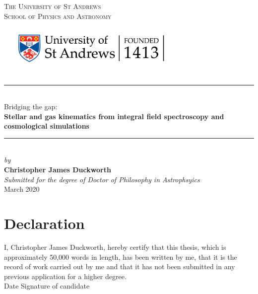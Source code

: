 \documentclass[11pt]{book}
\begin{document}
\pagestyle{empty}

\begin{titlepage}
\newcommand{\HRule}{\rule{\linewidth}{0.5mm}}
\center
\vspace*{0.3cm}
\textsc{\LARGE The University of St Andrews}\\[0.1cm] %
\textsc{\Large School of Physics and Astronomy}\\[3cm] %
\includegraphics[width=0.7\textwidth]{thesis/latex/st_a_logo_.png}

\HRule \\[0.4cm]
{ \LARGE Bridging the gap: \\} 
\textbf{Stellar and gas kinematics from integral field spectroscopy and cosmological simulations} \\[0.4cm] %
\HRule \\[1.6cm]
\Large
\textsl{by} \\
\textbf{Christopher James Duckworth}
\\
\vspace*{2cm}
\textsl{\Large Submitted for the degree of Doctor of Philosophy in Astrophsyics}\\[0.6cm] %
{\Large {March 2020}}\\[3cm]
\vfill %

\end{titlepage}

\frontmatter

\chapter{Declaration}

I, Christopher James Duckworth, hereby certify that this thesis, which is approximately 50,000 words in length, has been written by me, that it is the record of work carried out by me and that it has not been submitted in any previous application for a higher degree.\\

Date  \hspace{1.8in} Signature of candidate \\
\end{document}

